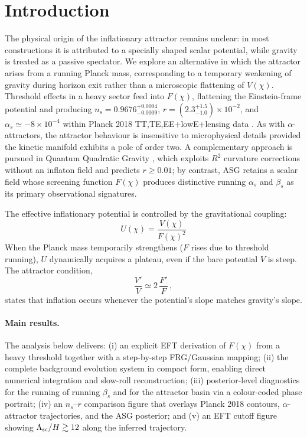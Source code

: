 \documentclass[11pt,a4paper]{article}
\begin{document}
\section{Introduction}
\label{sec:intro}
The physical origin of the inflationary attractor remains unclear: in most constructions it is attributed to a specially shaped scalar potential, while gravity is treated as a passive spectator. We explore an alternative in which the attractor arises from a running Planck mass, corresponding to a temporary weakening of gravity during horizon exit rather than a microscopic flattening of $V(\chi)$. Threshold effects in a heavy sector feed into $F(\chi)$, flattening the Einstein-frame potential and producing $n_s=0.9676^{+0.0004}_{-0.0009}$, $r=(2.3^{+1.5}_{-1.0})\times10^{-2}$, and $\alpha_s\simeq-8\times10^{-4}$ within Planck 2018 TT,TE,EE+lowE+lensing data \cite{Planck2018}. As with $\alpha$-attractors, the attractor behaviour is insensitive to microphysical details provided the kinetic manifold exhibits a pole of order two.
A complementary approach is pursued in Quantum Quadratic Gravity \cite{Liu2026}, which exploits $R^2$ curvature corrections without an inflaton field and predicts $r\ge0.01$; by contrast, ASG retains a scalar field whose screening function $F(\chi)$ produces distinctive running $\alpha_s$ and $\beta_s$ as its primary observational signatures.

\begin{tcolorbox}[colback=gray!5, colframe=gray!60, title={\textbf{Key relation: gravitational screening as the origin of inflation}}, fonttitle=\small]
The effective inflationary potential is controlled by the gravitational coupling:
\begin{equation}
\boxed{\;U(\chi)=\frac{V(\chi)}{F(\chi)^{2}}\;}
\tag{$\star$}
\end{equation}
When the Planck mass temporarily strengthens ($F$ rises due to threshold running), $U$ dynamically acquires a plateau, even if the bare potential $V$ is steep. The attractor condition,
\begin{equation}
\frac{V'}{V}\simeq 2\,\frac{F'}{F}\,,
\tag{$\star\star$}
\end{equation}
states that inflation occurs whenever the potential's slope matches gravity's slope.
\end{tcolorbox}

\paragraph{Main results.} The analysis below delivers: (i) an explicit EFT derivation of $F(\chi)$ from a heavy threshold together with a step-by-step FRG/Gaussian mapping; (ii) the complete background evolution system in compact form, enabling direct numerical integration and slow-roll reconstruction; (iii) posterior-level diagnostics for the running of running $\beta_s$ and for the attractor basin via a colour-coded phase portrait; (iv) an $n_s$--$r$ comparison figure that overlays Planck 2018 contours, $\alpha$-attractor trajectories, and the ASG posterior; and (v) an EFT cutoff figure showing $\Lambda_{\rm sc}/H \gtrsim 12$ along the inferred trajectory.
\end{document}
